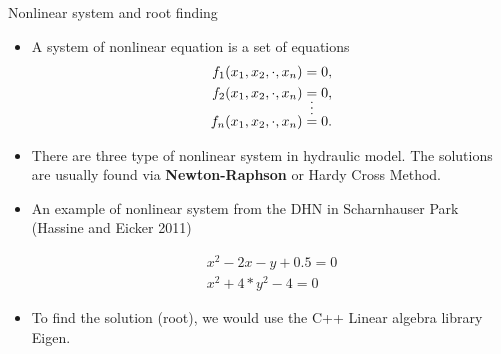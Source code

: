 \documentclass[xcolor=dvipsnames]{beamer}
\begin{document}
\begin{frame}[shrink=20]{Nonlinear system and root finding}

\begin{itemize}
	\item A system of nonlinear equation is a set of equations 
	\begin{align*}
		f_1(x_1,x_2,\cdot,x_n)&=0,\\
		f_2(x_1,x_2,\cdot,x_n)&=0,\\
		&\shortvdotswithin{=}
		f_n(x_1,x_2,\cdot,x_n)&=0.
	\end{align*}
	\item There are three type of nonlinear system in hydraulic model. The solutions are usually found via 
	\textbf{Newton-Raphson} or Hardy Cross Method.

	\item An example of nonlinear system from the DHN in Scharnhauser Park (Hassine and Eicker 2011)

	\begin{align*}
		x^2-2x-y+0.5=0\\
		x^2+4*y^2-4=0
	\end{align*}

	\item To find the solution (root), we would use the C++ Linear algebra library {\color{purple}Eigen}.  %

\end{itemize}
\end{frame}
\end{document}

